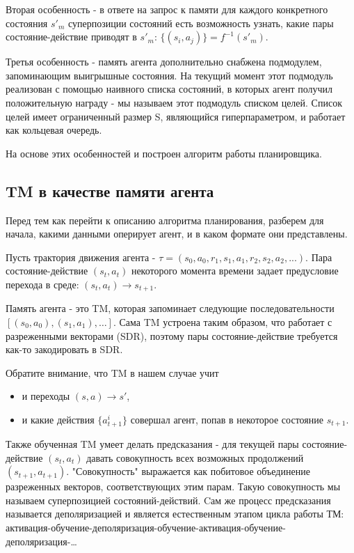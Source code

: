 \documentclass[a4paper]{article}
\begin{document}
Вторая особенность - в ответе на запрос к памяти для каждого конкретного состояния $s'_m$ суперпозиции состояний есть возможность узнать, какие пары состояние-действие приводят в $s'_m$: $\{(s_i, a_j)\} = f^{-1}(s'_m)$.

Третья особенность - память агента дополнительно снабжена подмодулем, запоминающим выигрышные состояния. На текущий момент этот подмодуль реализован с помощью наивного списка состояний, в которых агент получил положительную награду - мы называем этот подмодуль списком целей. Список целей имеет ограниченный размер S, являющийся гиперпараметром, и работает как кольцевая очередь.

На основе этих особенностей и построен алгоритм работы планировщика.

\subsection{TM в качестве памяти агента}

Перед тем как перейти к описанию алгоритма планирования, разберем для начала, какими данными оперирует агент, и в каком формате они представлены.

Пусть трактория движения агента - $\tau = (s_0, a_0, r_1, s_1, a_1, r_2, s_2, a_2, ...)$. Пара состояние-действие $(s_t, a_t)$ некоторого момента времени задает предусловие перехода в среде: $(s_t, a_t) \rightarrow s_{t+1}$.

Память агента - это TM, которая запоминает следующие последовательности $[(s_0, a_0), (s_1, a_1), \dots]$. Сама TM устроена таким образом, что работает с разреженными векторами (SDR), поэтому пары состояние-действие требуется как-то закодировать в SDR.

Обратите внимание, что TM в нашем случае учит
\begin{itemize}
  \item и переходы $(s, a) \rightarrow s'$,
  \item и какие действия $\{a^i_{t+1}\}$ совершал агент, попав в некоторое состояние $s_{t+1}$.
\end{itemize}

Также обученная TM умеет делать предсказания - для текущей пары состояние-действие $(s_t, a_t)$ давать совокупность всех возможных продолжений $(s_{t+1}, a_{t+1})$. "Совокупность" выражается как побитовое объединение разреженных векторов, соответствующих этим парам. Такую совокупность мы называем суперпозицией состояний-действий. Cам же процесс предсказания называется деполяризацией и является естественным этапом цикла работы ТМ: активация-обучение-деполяризация-обучение-активация-обучение-деполяризация-\dots
\end{document}
